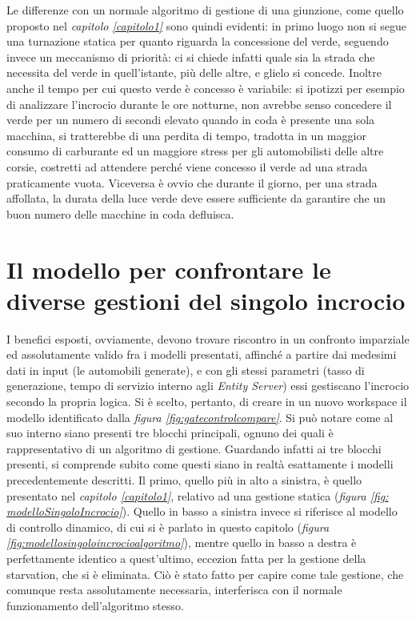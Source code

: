 Le differenze con un normale algoritmo di gestione di una giunzione, come quello proposto nel \textit{capitolo \ref{capitolo1}} sono quindi evidenti: in primo luogo non si segue una turnazione statica per quanto riguarda la concessione del verde, seguendo invece un meccanismo di priorità: ci si chiede infatti quale sia la strada che necessita del verde in quell'istante, più delle altre, e glielo si concede. Inoltre anche il tempo per cui questo verde è concesso è variabile: si ipotizzi per esempio di analizzare l'incrocio durante le ore notturne, non avrebbe senso concedere il verde per un numero di secondi elevato quando in coda è presente una sola macchina, si tratterebbe di una perdita di tempo, tradotta in un maggior consumo di carburante ed un maggiore stress per gli automobilisti delle altre corsie, costretti ad attendere perché viene concesso il verde ad una strada praticamente vuota. Viceversa è ovvio che durante il giorno, per una strada affollata, la durata della luce verde deve essere sufficiente da garantire che un buon numero delle macchine in coda defluisca.
\newpage

\section{Il modello per confrontare le diverse gestioni del singolo incrocio}

I benefici esposti, ovviamente, devono trovare riscontro in un confronto imparziale ed assolutamente valido fra i modelli presentati, affinché a partire dai medesimi dati in input (le automobili generate), e con gli stessi parametri (tasso di generazione, tempo di servizio interno agli \textit{Entity Server}) essi gestiscano l'incrocio secondo la propria logica. Si è scelto, pertanto, di creare in un nuovo workspace il modello identificato dalla \textit{figura \ref{fig:gatecontrolcompare}}. Si può notare come al suo interno siano presenti tre blocchi principali, ognuno dei quali è rappresentativo di un algoritmo di gestione. Guardando infatti ai tre blocchi presenti, si comprende subito come questi siano in realtà esattamente i modelli precedentemente descritti. Il primo, quello più in alto a sinistra, è quello presentato nel \textit{capitolo \ref{capitolo1}}, relativo ad una gestione statica (\textit{figura \ref{fig: modelloSingoloIncrocio}}). Quello in basso a sinistra invece si riferisce al modello di controllo dinamico, di cui si è parlato in questo capitolo (\textit{figura \ref{fig:modellosingoloincrocioalgoritmo}}), mentre quello in basso a destra è perfettamente identico a quest'ultimo, eccezion fatta per la gestione della starvation, che si è eliminata. Ciò è stato fatto per capire come tale gestione, che comunque resta assolutamente necessaria, interferisca con il normale funzionamento dell'algoritmo stesso.


